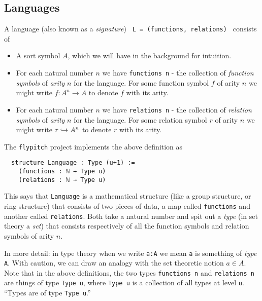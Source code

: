 
\subsection{Languages}
\begin{dfn}[Language]
  A language (also known as a \textit{signature}) \texttt{ L = (functions, relations) } consists of

  \begin{itemize}
    \item A sort symbol $A$, which we will have in the background for intuition.
    \item For each natural number $n$ we have \texttt{functions n} -
          the collection of \textit{function symbols} of \textit{arity} $n$ for the language.
          For some function symbol $f$ of arity $n$ we might write
          $f : A^{n} \to A$ to denote $f$ with its arity.
    \item For each natural number $n$ we have \texttt{relations n} -
          the collection of \textit{relation symbols} of \textit{arity} $n$ for the language.
          For some relation symbol $r$ of arity $n$ we might write
          $r \hookrightarrow A^{n}$ to denote $r$ with its arity.
  \end{itemize}

  The \texttt{flypitch} project implements the above definition as

  \begin{lstlisting}
  structure Language : Type (u+1) :=
    (functions : ℕ → Type u)
    (relations : ℕ → Type u)\end{lstlisting}

  This says that \texttt{Language} is a mathematical structure
  (like a group structure, or ring structure)
  that consists of two pieces of data,
  a map called \texttt{functions} and another called \texttt{relations}.
  Both take a natural number and spit out a \textit{type}
  (in set theory a \textit{set})
  that consists respectively of all the function symbols and relation symbols
  of arity $n$.

  In more detail: in type theory when we write \texttt{a:A} we mean \texttt{a} is something
  of \textit{type} \texttt{A}.
  With caution, we can draw an analogy with the set theoretic notion $a \in A$.
  Note that in the above definitions, the two types
  \texttt{functions n} and \texttt{relations n} are things of type \texttt{Type u},
  where \texttt{Type u} is a collection of all types at level \texttt{u}.
  ``Types are of type \texttt{Type u}.''


\end{dfn}
